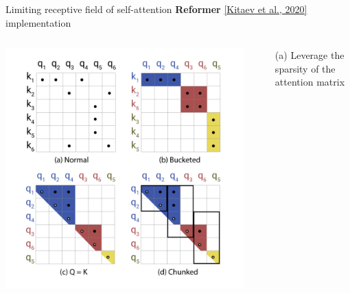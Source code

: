 \documentclass[usenames,dvipsnames,notes,11pt,aspectratio=169,hyperref={colorlinks=true, linkcolor=blue}]{beamer}
\begin{document}
\begin{frame}
    {Limiting receptive field of self-attention}
    \textbf{Reformer} \href{https://arxiv.org/pdf/2001.04451.pdf}{[Kitaev et al., 2020]} implementation\\[1em]

    \begin{columns}
        \begin{column}{0.4\textwidth}
        {\includegraphics[width=\textwidth]{figures/reformer}}
        \end{column}
        \begin{column}{0.6\textwidth}
            \begin{itemize}[<+->]
                \item[(a)] Leverage the sparsity of the attention matrix
            \end{itemize}



\end{column}
\end{columns}
\end{frame}
\end{document}
